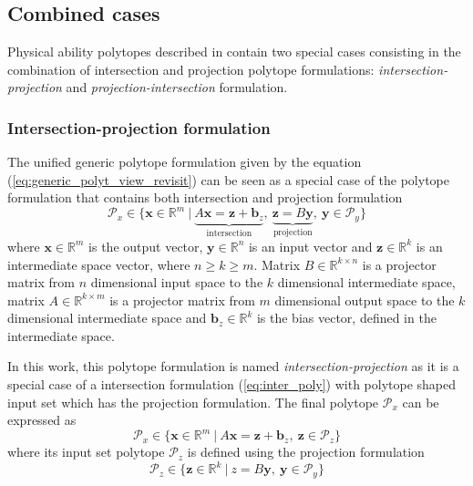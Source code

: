 \subsection{Combined cases}
\label{ch:combined_forms}
Physical ability polytopes described in  contain two special cases consisting in the combination of intersection and projection polytope formulations: \textit{intersection-projection} and \textit{projection-intersection} formulation.

\subsubsection{Intersection-projection formulation}
\label{ch:inter_proj_form}

The unified generic polytope formulation given by the equation (\ref{eq:generic_polyt_view_revisit}) can be seen as a special case of the polytope formulation that contains both intersection and projection formulation
\begin{equation}
    \mathcal{P}_x \in \{\bm{x}\in \mathbb{R}^m~|~\underbrace{A \bm{x}= \bm{z}+ \bm{b}_z}_{\text{intersection}},~ \underbrace{ \bm{z}=B \bm{y}}_{\text{projection}} ,~ \bm{y} \in \mathcal{P}_y\} 
    \label{eq:inter_proj_poly}
\end{equation}
where $\bm{x}\in\mathbb{R}^m$ is the output vector, $\bm{y} \in \mathbb{R}^n$ is an input vector and $\bm{z}\in\mathbb{R}^k$ is an intermediate space vector, where $n\!\geq\!k\!\geq\!m$. Matrix $B\in \mathbb{R}^{k \times n}$ is a projector matrix from $n$ dimensional input space to the $k$ dimensional intermediate space, matrix $A\in \mathbb{R}^{k\times m}$ is a projector matrix from $m$ dimensional output space to the $k$ dimensional intermediate space and $\bm{b}_z\in\mathbb{R}^k$ is the bias vector, defined in the intermediate space.

In this work, this polytope formulation is named \textit{intersection-projection} as it is a special case of a intersection formulation (\ref{eq:inter_poly}) with polytope shaped input set which has the projection formulation. The final polytope $\mathcal{P}_x$ can be expressed as
\begin{equation}
    \mathcal{P}_x \in \{\bm{x}\in \mathbb{R}^m~|~A \bm{x} = \bm{z} + \bm{b}_z,~ \bm{z} \in \mathcal{P}_z\} 
\end{equation}
where its input set polytope $\mathcal{P}_z$ is defined using the projection formulation
\begin{equation}
    \mathcal{P}_z \in \{\bm{z}\in \mathbb{R}^k~|~z = B\bm{y},~ \bm{y} \in \mathcal{P}_y\} 
\end{equation}

